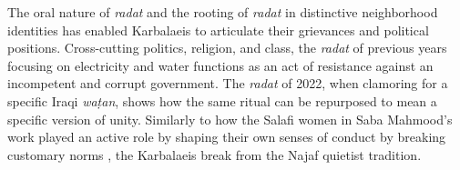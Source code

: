 The oral nature of \emph{radat} and the rooting of \emph{radat} in distinctive neighborhood identities has enabled Karbalaeis to articulate their grievances and political positions. Cross-cutting politics, religion, and class, the \emph{radat} of previous years focusing on electricity and water functions as an act of resistance against an incompetent and corrupt government. The \emph{radat} of 2022, when clamoring for a specific Iraqi \emph{waṭan}, shows how the same ritual can be repurposed to mean a specific version of unity. Similarly to how the Salafi women in Saba Mahmood's work played an active role by shaping their own senses of conduct by breaking customary norms \cite[87]{mahmood_politics_2005}, the Karbalaeis break from the Najaf quietist tradition.


